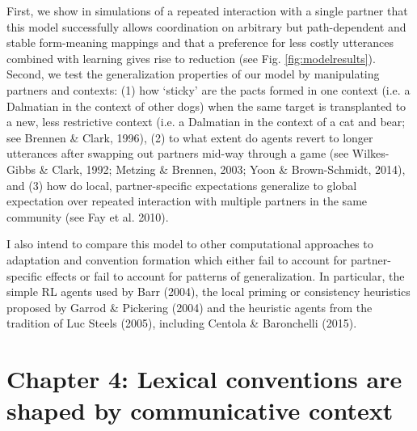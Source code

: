 \documentclass[12pt, donotrepeattitle, man, floatsintext]{apa6}
\begin{document}
First, we show in simulations of a repeated interaction with a single partner that this model successfully allows coordination on arbitrary but path-dependent and stable form-meaning mappings and that a preference for less costly utterances combined with learning gives rise to reduction (see Fig. \ref{fig:modelresults}). Second, we test the generalization properties of our model by manipulating partners and contexts: (1) how `sticky' are the pacts formed in one context (i.e. a Dalmatian in the context of other dogs) when the same target is transplanted to a new, less restrictive context (i.e. a Dalmatian in the context of a cat and bear; see Brennen \& Clark, 1996), (2) to what extent do agents revert to longer utterances after swapping out partners mid-way through a game (see  Wilkes-Gibbs \& Clark, 1992; Metzing \& Brennen, 2003; Yoon \& Brown-Schmidt, 2014), and (3) how do local, partner-specific expectations generalize to global expectation over repeated interaction with multiple partners in the same community (see Fay et al. 2010).

I also intend to compare this model to other computational approaches to adaptation and convention formation which either fail to account for partner-specific effects or fail to account for patterns of generalization. In particular, the simple RL agents used by Barr (2004), the local priming or consistency heuristics proposed by Garrod \& Pickering (2004) and the heuristic agents from the tradition of Luc Steels (2005), including Centola \& Baronchelli (2015).

\noindent{}
\vspace{1cm}

\section{Chapter 4: Lexical conventions are shaped by communicative context}
\end{document}
